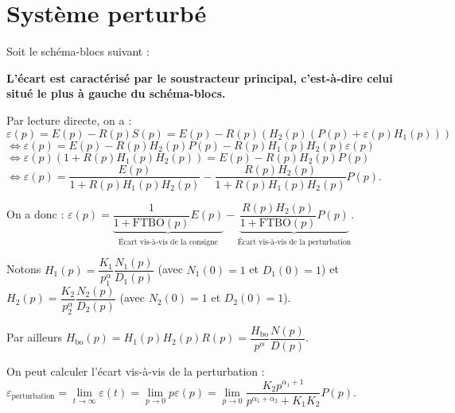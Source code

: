 \documentclass[10pt,fleqn]{article} %
\begin{document}
%

%
%

\section{Système perturbé}
Soit le schéma-blocs suivant : 
\begin{center}

\end{center}

\vspace{.25cm}

\textbf{L'écart est caractérisé par le soustracteur principal, c'est-à-dire celui situé le plus à gauche du schéma-blocs.}

\vspace{.25cm}

Par lecture directe, on a : 
$\varepsilon(p)
=E(p)-R(p)S(p)
=E(p)-R(p)\left(H_2(p) \left(P(p)+\varepsilon(p)H_1(p) \right)\right)$
$\Longleftrightarrow 
\varepsilon(p) =E(p)- R(p)H_2(p)P(p)-R(p)H_1(p)H_2(p)\varepsilon(p) $
$\Longleftrightarrow \varepsilon(p)\left( 1+R(p)H_1(p)H_2(p)\right) =E(p)- R(p)H_2(p)P(p)$
$\Longleftrightarrow \varepsilon(p) =\dfrac{E(p)}{1+R(p)H_1(p)H_2(p)}- \dfrac{R(p)H_2(p)}{1+R(p)H_1(p)H_2(p)}P(p)$.

On a donc :
$\varepsilon(p) =\underbrace{\dfrac{1}{1+\text{FTBO}(p)} E(p)}_{\text{\'Ecart vis-à-vis de la consigne}} - \underbrace{\dfrac{R(p)H_2(p)}{1+\text{FTBO}(p)}P(p)}_{\text{\'Ecart vis-à-vis de la perturbation}}$.

Notons $H_1(p)=\dfrac{K_1}{p^\alpha_1}\dfrac{N_1(p)}{D_1(p)}$ (avec $N_1(0)=1$ et $D_1(0)=1$) et $H_2(p)=\dfrac{K_2}{p^\alpha_2}\dfrac{N_2(p)}{D_2(p)}$ (avec $N_2(0)=1$ et $D_2(0)=1$).

Par ailleurs 
$H_{\text{bo}}(p)=H_1(p)H_2(p)R(p)
=\dfrac{H_{\text{bo}}}{p^{\alpha}}\dfrac{N(p)}{D(p)}$.

On peut calculer l'écart vis-à-vis de la perturbation : 
$\varepsilon_{\text{perturbation}}
= \lim\limits_{t\to\infty}\varepsilon(t)
= \lim\limits_{p\to 0}p \varepsilon(p) 
= \lim\limits_{p\to 0} \dfrac{K_2 p^{\alpha_1+1}}{p^{\alpha_1+\alpha_2}+K_1K_2}P(p) $.
\end{document}
